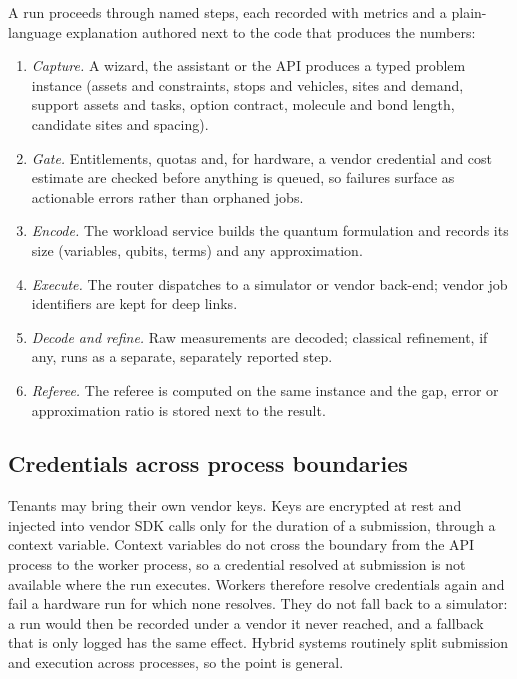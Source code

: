 \documentclass[11pt,a4paper]{article}
\begin{document}
A run proceeds through named steps, each recorded with metrics and a
plain-language explanation authored next to the code that produces the
numbers:
\begin{enumerate}
  \item \emph{Capture.} A wizard, the assistant or the API produces a typed
        problem instance (assets and constraints, stops and vehicles, sites
        and demand, support assets and tasks, option contract, molecule and
        bond length, candidate sites and spacing).
  \item \emph{Gate.} Entitlements, quotas and, for hardware, a vendor
        credential and cost estimate are checked before anything is queued,
        so failures surface as actionable errors rather than orphaned jobs.
  \item \emph{Encode.} The workload service builds the quantum formulation and
        records its size (variables, qubits, terms) and any approximation.
  \item \emph{Execute.} The router dispatches to a simulator or vendor
        back-end; vendor job identifiers are kept for deep links.
  \item \emph{Decode and refine.} Raw measurements are decoded; classical
        refinement, if any, runs as a separate, separately reported step.
  \item \emph{Referee.} The referee is computed on the same instance and the
        gap, error or approximation ratio is stored next to the result.
\end{enumerate}

\subsection{Credentials across process boundaries}

Tenants may bring their own vendor keys. Keys are encrypted at rest and
injected into vendor SDK calls only for the duration of a submission, through
a context variable. Context variables do not cross the boundary from the API
process to the worker process, so a credential resolved at submission is not
available where the run executes. Workers therefore resolve credentials
again and fail a hardware run for which none resolves. They do not fall back
to a simulator: a run would then be recorded under a vendor it never
reached, and a fallback that is only logged has the same effect. Hybrid
systems routinely split submission and execution across processes, so the
point is general.
\end{document}
